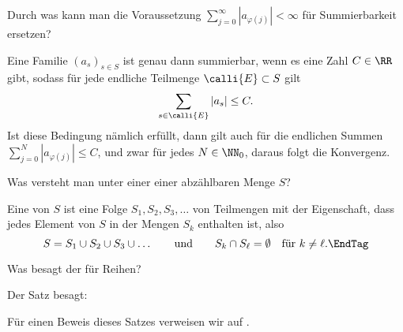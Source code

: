 \begin{frage}
  Durch was kann man die Voraussetzung 
  $\sum_{j=0}^\infty | a_{\varphi(j)} |<\infty$ für Summierbarkeit 
  ersetzen?
\end{frage}

\begin{antwort}
  Eine Familie $(a_s)_{s\in S}$ ist genau dann summierbar, wenn es eine 
  Zahl $C\in\RR$ gibt, sodass für jede endliche Teilmenge $\calli{E}\subset S$ 
  gilt
  \[
  \sum_{s\in \calli{E}} |a_s| \le C.
  \]
  Ist diese Bedingung nämlich erfüllt, dann gilt auch für 
  die endlichen Summen $\sum_{j=0}^N |a_{\varphi(j)}| \le C$, und zwar 
  für jedes $N\in\NN_0$, daraus folgt die Konvergenz. \AntEnd
\end{antwort} 

\begin{frage}
  Was versteht man unter einer  einer abzählbaren 
  Menge $S$?
\end{frage}

\begin{antwort}
  Eine  von $S$ ist eine Folge $S_1, S_2, S_3, \ldots$ von 
  Teilmengen mit der Eigenschaft, dass jedes Element von $S$ in 
   der Mengen $S_k$ enthalten ist, also    
  \[
  S=S_1 \cup S_2 \cup S_3 \cup \ldots \qquad\text{und}\qquad
  S_k \cap S_\ell=\emptyset\quad\text{für $k\not=\ell$}. \EndTag
  \]
\end{antwort}

\begin{frage}
  Was besagt der  für Reihen?
\end{frage}

\begin{antwort}
  Der Satz besagt: 

  \medskip\noindent
  Für einen Beweis dieses Satzes verweisen wir {\zB} auf \citep{Kaballo}. \AntEnd
\end{antwort} 

